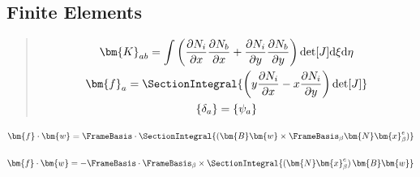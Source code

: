 \subsection{Finite Elements}\label{finite-elements}

\cite{surana1979isoparametric}

\begin{quote}
\[
\begin{gathered}
\bm{K}_{a b}=\int \left(\frac{\partial N_{i}}{\partial x} \frac{\partial N_{b}}{\partial x}+\frac{\partial N_{i}}{\partial y} \frac{\partial N_{b}}{\partial y}\right) \operatorname{det}[J] \mathrm{d} \xi \mathrm{d} \eta \\
\bm{f}_{a}=\SectionIntegral{\left(y \frac{\partial N_{i}}{\partial x}-x \frac{\partial N_{i}}{\partial y}\right) \operatorname{det}[J]
} \\
\left\{\delta_{a}\right\}=\left\{\psi_{a}\right\}
\end{gathered}
\]
\end{quote}


\begin{equation}
    \bm{f}\cdot\bm{w} = \FrameBasis \cdot \SectionIntegral{(\bm{B}\bm{w} \times \FrameBasis_{\beta} \bm{N}\bm{x}^e_{\beta})}
\end{equation}

\begin{equation}
    \bm{f}\cdot\bm{w} = -\FrameBasis \cdot \FrameBasis_{\beta}\times \SectionIntegral{ (\bm{N}\bm{x}^e_{\beta})\, \bm{B}\bm{w}}
\end{equation}